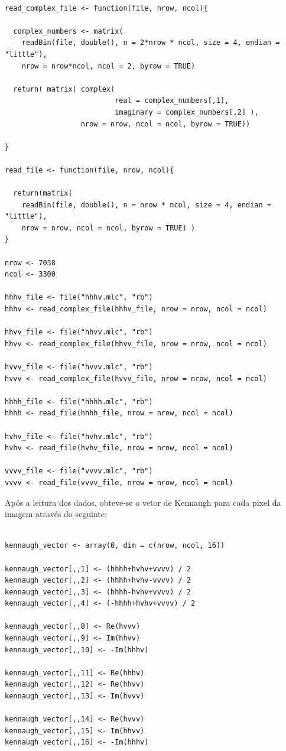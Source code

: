 \documentclass[12pt]{article}
\begin{document}
\begin{verbatim}

read_complex_file <- function(file, nrow, ncol){
  
  complex_numbers <- matrix(
    readBin(file, double(), n = 2*nrow * ncol, size = 4, endian = "little"), 
    nrow = nrow*ncol, ncol = 2, byrow = TRUE)
  
  return( matrix( complex( 
                          real = complex_numbers[,1], 
                          imaginary = complex_numbers[,2] ), 
                  nrow = nrow, ncol = ncol, byrow = TRUE))
  
}

read_file <- function(file, nrow, ncol){
  
  return(matrix(
    readBin(file, double(), n = nrow * ncol, size = 4, endian = "little"), 
    nrow = nrow, ncol = ncol, byrow = TRUE) )
}

nrow <- 7038
ncol <- 3300

hhhv_file <- file("hhhv.mlc", "rb")
hhhv <- read_complex_file(hhhv_file, nrow = nrow, ncol = ncol)

hhvv_file <- file("hhvv.mlc", "rb")
hhvv <- read_complex_file(hhvv_file, nrow = nrow, ncol = ncol)

hvvv_file <- file("hvvv.mlc", "rb")
hvvv <- read_complex_file(hvvv_file, nrow = nrow, ncol = ncol)

hhhh_file <- file("hhhh.mlc", "rb")
hhhh <- read_file(hhhh_file, nrow = nrow, ncol = ncol)

hvhv_file <- file("hvhv.mlc", "rb")
hvhv <- read_file(hvhv_file, nrow = nrow, ncol = ncol)

vvvv_file <- file("vvvv.mlc", "rb")
vvvv <- read_file(vvvv_file, nrow = nrow, ncol = ncol)

\end{verbatim}

Após a leitura dos dados, obteve-se o vetor de Kennaugh para cada pixel da imagem através do seguinte: 

\begin{verbatim}
    
kennaugh_vector <- array(0, dim = c(nrow, ncol, 16))

kennaugh_vector[,,1] <- (hhhh+hvhv+vvvv) / 2
kennaugh_vector[,,2] <- (hhhh+hvhv-vvvv) / 2
kennaugh_vector[,,3] <- (hhhh-hvhv+vvvv) / 2
kennaugh_vector[,,4] <- (-hhhh+hvhv+vvvv) / 2
 
kennaugh_vector[,,8] <- Re(hvvv)
kennaugh_vector[,,9] <- Im(hhvv)
kennaugh_vector[,,10] <- -Im(hhhv)
    
kennaugh_vector[,,11] <- Re(hhhv)
kennaugh_vector[,,12] <- Re(hhvv)
kennaugh_vector[,,13] <- Im(hvvv)
    
kennaugh_vector[,,14] <- Re(hvvv)
kennaugh_vector[,,15] <- Im(hhvv)
kennaugh_vector[,,16] <- -Im(hhhv)

\end{verbatim}
\end{document}
